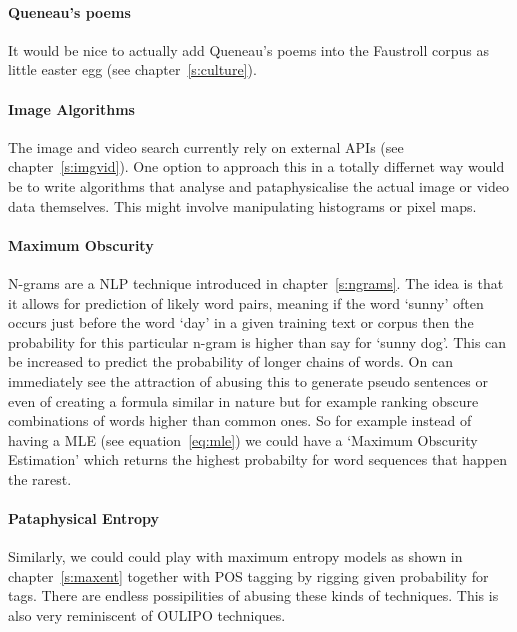 \documentclass[11pt]{thesis} %
\begin{document}
\paragraph{Queneau's poems}
It would be nice to actually add Queneau's poems \autocite{Queneau1961} into the Faustroll corpus as little easter egg (see chapter~\ref{s:culture}).

\paragraph{Image Algorithms}
The image and video search currently rely on external \ac{API}s (see chapter~\ref{s:imgvid}). One option to approach this in a totally differnet way would be to write algorithms that analyse and pataphysicalise the actual image or video data themselves. This might involve manipulating histograms or pixel maps.

\paragraph{Maximum Obscurity}
N-grams are a \ac{NLP} technique introduced in chapter~\ref{s:ngrams}. The idea is that it allows for prediction of likely word pairs, meaning if the word `sunny' often occurs just before the word `day' in a given training text or corpus then the probability for this particular n-gram is higher than say for `sunny dog'. This can be increased to predict the probability of longer chains of words. On can immediately see the attraction of abusing this to generate pseudo sentences or even of creating a formula similar in nature but for example ranking obscure combinations of words higher than common ones. So for example instead of having a \ac{MLE} (see equation~\ref{eq:mle}\marginnote{$\bm{\Sigma}$~\ref{eq:mle}}) we could have a `Maximum Obscurity Estimation' which returns the highest probabilty for word sequences that happen the rarest.

\paragraph{Pataphysical Entropy}
Similarly, we could could play with maximum entropy models as shown in chapter~\ref{s:maxent} together with \ac{POS} tagging by rigging given probability for tags. There are endless possipilities of abusing these kinds of techniques. This is also very reminiscent of \ac{OULIPO} techniques. 
\end{document}
